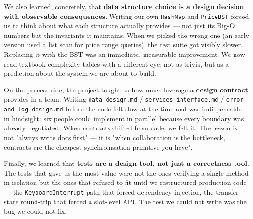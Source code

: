 \documentclass[11pt,a4paper]{article}
\begin{document}
We also learned, concretely, that \textbf{data structure choice is a design decision with observable consequences}. Writing our own \texttt{HashMap} and \texttt{PriceBST} forced us to think about what each structure actually provides — not just its Big-O numbers but the invariants it maintains. When we picked the wrong one (an early version used a list scan for price range queries), the test suite got visibly slower. Replacing it with the BST was an immediate, measurable improvement. We now read textbook complexity tables with a different eye: not as trivia, but as a prediction about the system we are about to build.

On the process side, the project taught us how much leverage a \textbf{design contract} provides in a team. Writing \texttt{data-design.md} / \texttt{services-interface.md} / \texttt{error-and-log-design.md} before the code felt slow at the time and was indispensable in hindsight: six people could implement in parallel because every boundary was already negotiated. When contracts drifted from code, we felt it. The lesson is not "always write docs first" — it is "when collaboration is the bottleneck, contracts are the cheapest synchronisation primitive you have".

Finally, we learned that \textbf{tests are a design tool, not just a correctness tool}. The tests that gave us the most value were not the ones verifying a single method in isolation but the ones that refused to fit until we restructured production code — the \texttt{KeyboardInterrupt} path that forced dependency injection, the transfer-state round-trip that forced a slot-level API. The test we could not write was the bug we could not fix.
\end{document}
